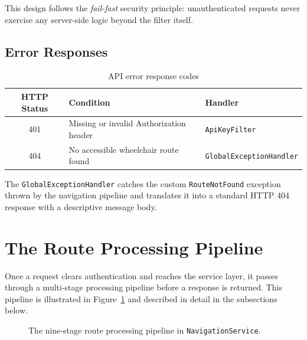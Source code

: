 \documentclass[12pt, a4paper]{report}
\begin{document}
This design follows the \emph{fail-fast} security principle: unauthenticated requests never exercise any server-side logic beyond the filter itself.

\subsection{Error Responses}
\label{subsec:errors}

\begin{table}[H]
\centering
\caption{API error response codes}
\begin{tabular}{@{}cll@{}}
\toprule
\textbf{HTTP Status} & \textbf{Condition} & \textbf{Handler} \\
\midrule
401 & Missing or invalid Authorization header & \texttt{ApiKeyFilter} \\
404 & No accessible wheelchair route found & \texttt{GlobalExceptionHandler} \\
\bottomrule
\end{tabular}
\end{table}

The \texttt{GlobalExceptionHandler} catches the custom \texttt{RouteNotFound} exception thrown by the navigation pipeline and translates it into a standard HTTP 404 response with a descriptive message body.

\section{The Route Processing Pipeline}
\label{sec:pipeline}

Once a request clears authentication and reaches the service layer, it passes through a multi-stage processing pipeline before a response is returned. This pipeline is illustrated in Figure~\ref{fig:pipeline} and described in detail in the subsections below.

\begin{figure}[H]
\centering
{}
\caption{The nine-stage route processing pipeline in \texttt{NavigationService}.}
\label{fig:pipeline}
\end{figure}
\end{document}
